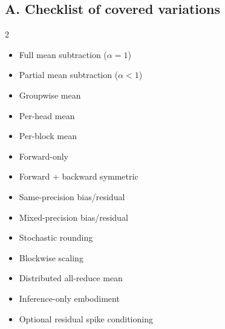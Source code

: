 \documentclass[11pt]{article}
\begin{document}
\subsection*{A. Checklist of covered variations}
\begin{multicols}{2}
\begin{itemize}[leftmargin=1.2em]
\item Full mean subtraction ($\alpha=1$)
\item Partial mean subtraction ($\alpha<1$)
\item Groupwise mean
\item Per-head mean
\item Per-block mean
\item Forward-only
\item Forward + backward symmetric
\item Same-precision bias/residual
\item Mixed-precision bias/residual
\item Stochastic rounding
\item Blockwise scaling
\item Distributed all-reduce mean
\item Inference-only embodiment
\item Optional residual spike conditioning
\end{itemize}
\end{multicols}
\end{document}
